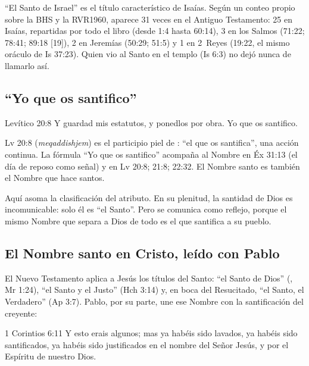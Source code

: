 ``El Santo de Israel'' es el título característico de Isaías. Según un conteo propio sobre la BHS y la RVR1960, aparece 31 veces en el Antiguo Testamento: 25 en Isaías, repartidas por todo el libro (desde 1:4 hasta 60:14), 3 en los Salmos (71:22; 78:41; 89:18 [19]), 2 en Jeremías (50:29; 51:5) y 1 en 2~Reyes (19:22, el mismo oráculo de Is 37:23). Quien vio al Santo en el templo (Is 6:3) no dejó nunca de llamarlo así.

\subsection{“Yo \SENOR{} que os santifico”}
\begin{verso}{Levítico 20:8}
Y guardad mis estatutos, y ponedlos por obra. Yo \SENOR{} que os santifico.
\end{verso}

\begin{filologiatexto}{Lv 20:8}
 (\emph{meqaddishjem}) es el participio piel de : ``el que os santifica'', una acción continua. La fórmula ``Yo \SENOR{} que os santifico'' acompaña al Nombre en Éx 31:13 (el día de reposo como señal) y en Lv 20:8; 21:8; 22:32. El Nombre santo es también el Nombre que hace santos.
\end{filologiatexto}

Aquí asoma la clasificación del atributo. En su plenitud, la santidad de Dios es incomunicable: solo él es ``el Santo''. Pero se comunica como reflejo, porque el mismo Nombre que separa a Dios de todo es el que santifica a su pueblo.

\subsection{El Nombre santo en Cristo, leído con Pablo}
El Nuevo Testamento aplica a Jesús los títulos del Santo: ``el Santo de Dios'' (, Mr 1:24), ``el Santo y el Justo'' (Hch 3:14) y, en boca del Resucitado, ``el Santo, el Verdadero'' (Ap 3:7). Pablo, por su parte, une ese Nombre con la santificación del creyente:

\begin{verso}{1 Corintios 6:11}
Y esto erais algunos; mas ya habéis sido lavados, ya habéis sido santificados, ya habéis sido justificados en el nombre del Señor Jesús, y por el Espíritu de nuestro Dios.
\end{verso}

